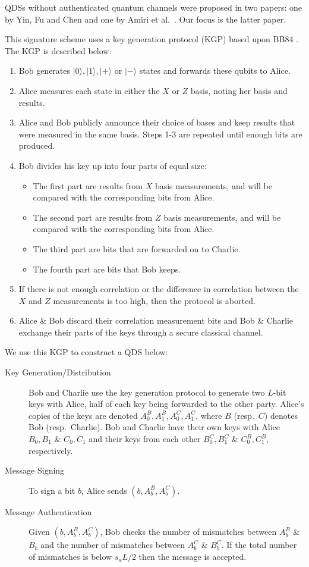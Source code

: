 \documentclass[%
 reprint,
 amsmath,amssymb,
 aps,
 pra,
]{revtex4-1}
\begin{document}
QDSs without authenticated quantum channels were proposed in two papers: one by Yin, Fu and Chen \cite{PhysRevA.93.032316} and one by Amiri et al.\ \cite{PhysRevA.93.032325}. Our focus is the latter paper.

This signature scheme uses a key generation protocol (KGP) based upon BB84 \cite{BB84}. The KGP is described below:

\begin{enumerate}
\item Bob generates $|0\rangle, |1\rangle, |+\rangle \text{ or } |-\rangle$ states and forwards these qubits to Alice.
\item Alice measures each state in either the $X$ or $Z$ basis, noting her basis and results.
\item Alice and Bob publicly announce their choice of bases and keep results that were measured in the same basis. Steps 1-3 are repeated until enough bits are produced.
\item Bob divides his key up into four parts of equal size:
\begin{itemize}
\item The first part are results from $X$ basis measurements, and will be compared with the corresponding bits from Alice.
\item The second part are results from $Z$ basis measurements, and will be compared with the corresponding bits from Alice.
\item The third part are bits that are forwarded on to Charlie.
\item The fourth part are bits that Bob keeps.
\end{itemize}
\item If there is not enough correlation or the difference in correlation between the $X$ and $Z$ measurements is too high, then the protocol is aborted.
\item Alice \& Bob discard their correlation measurement bits and Bob \& Charlie exchange their parts of the keys through a secure classical channel.
\end{enumerate}

We use this KGP to construct a QDS below:

\begin{description}
\item[Key Generation/Distribution]Bob and Charlie use the key generation protocol to generate two $L$-bit keys with Alice, half of each key being forwarded to the other party. Alice's copies of the keys are denoted $A^B_0, A^B_1, A^C_0, A^C_1$, where $B$ (resp.\ $C$) denotes Bob (resp.\ Charlie). Bob and Charlie have their own keys with Alice $B_0, B_1$ \& $C_0, C_1$ and their keys from each other $B^C_0, B^C_1$ \& $C^B_0, C^B_1$, respectively.
\item[Message Signing]To sign a bit $b$, Alice sends $(b, A^B_b, A^C_b)$.
\item[Message Authentication]Given $(b, A^B_b, A^C_b)$, Bob checks the number of mismatches between $A^B_b$ \& $B_b$ and the number of mismatches between $A^C_b$ \& $B^C_b$. If the total number of mismatches is below $s_aL/2$ then the message is accepted.
\end{description}
\end{document}

